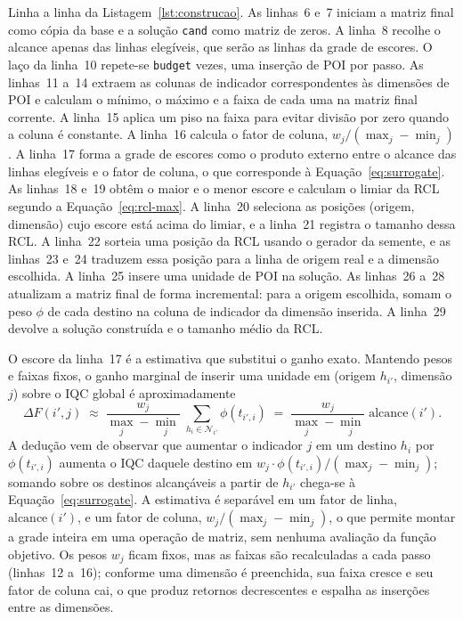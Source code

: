 \documentclass[11pt,a4paper]{article}
\newcommand{\code}[1]{\texttt{#1}}
\begin{document}
Linha a linha da Listagem~\ref{lst:construcao}. As linhas~6 e~7 iniciam a matriz final como cópia da base e a solução \code{cand} como matriz de zeros. A linha~8 recolhe o alcance apenas das linhas elegíveis, que serão as linhas da grade de escores. O laço da linha~10 repete-se \code{budget} vezes, uma inserção de POI por passo. As linhas~11 a~14 extraem as colunas de indicador correspondentes às dimensões de POI e calculam o mínimo, o máximo e a faixa de cada uma na matriz final corrente. A linha~15 aplica um piso na faixa para evitar divisão por zero quando a coluna é constante. A linha~16 calcula o fator de coluna, $w_j/(\max_j-\min_j)$. A linha~17 forma a grade de escores como o produto externo entre o alcance das linhas elegíveis e o fator de coluna, o que corresponde à Equação~\eqref{eq:surrogate}. As linhas~18 e~19 obtêm o maior e o menor escore e calculam o limiar da RCL segundo a Equação~\eqref{eq:rcl-max}. A linha~20 seleciona as posições (origem, dimensão) cujo escore está acima do limiar, e a linha~21 registra o tamanho dessa RCL. A linha~22 sorteia uma posição da RCL usando o gerador da semente, e as linhas~23 e~24 traduzem essa posição para a linha de origem real e a dimensão escolhida. A linha~25 insere uma unidade de POI na solução. As linhas~26 a~28 atualizam a matriz final de forma incremental: para a origem escolhida, somam o peso $\phi$ de cada destino na coluna de indicador da dimensão inserida. A linha~29 devolve a solução construída e o tamanho médio da RCL.

O escore da linha~17 é a estimativa que substitui o ganho exato. Mantendo pesos e faixas fixos, o ganho marginal de inserir uma unidade em (origem $h_{i'}$, dimensão $j$) sobre o IQC global é aproximadamente
\begin{equation}
\Delta F(i',j) \;\approx\; \frac{w_j}{\max_j - \min_j}\;\sum_{h_i \in \mathcal{N}_{i'}} \phi(t_{i',i})
\;=\; \frac{w_j}{\max_j - \min_j}\; \text{alcance}(i').
\label{eq:surrogate}
\end{equation}
A dedução vem de observar que aumentar o indicador $j$ em um destino $h_i$ por $\phi(t_{i',i})$ aumenta o IQC daquele destino em $w_j \cdot \phi(t_{i',i})/(\max_j - \min_j)$; somando sobre os destinos alcançáveis a partir de $h_{i'}$ chega-se à Equação~\eqref{eq:surrogate}. A estimativa é separável em um fator de linha, $\text{alcance}(i')$, e um fator de coluna, $w_j/(\max_j-\min_j)$, o que permite montar a grade inteira em uma operação de matriz, sem nenhuma avaliação da função objetivo. Os pesos $w_j$ ficam fixos, mas as faixas são recalculadas a cada passo (linhas~12 a~16); conforme uma dimensão é preenchida, sua faixa cresce e seu fator de coluna cai, o que produz retornos decrescentes e espalha as inserções entre as dimensões.
\end{document}
